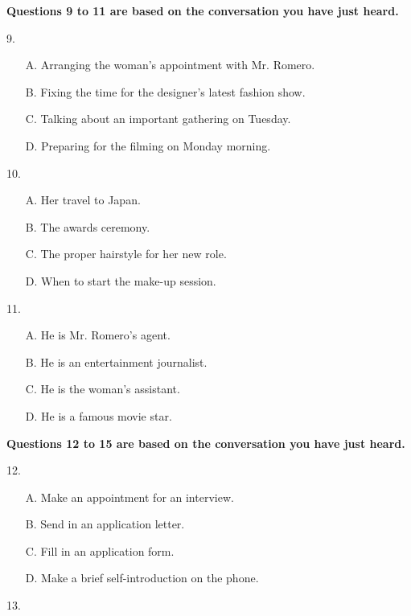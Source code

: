 \documentclass[UTF8,11pt]{ctexart}
\begin{document}
\textbf{Questions 9 to 11 are based on the conversation you have just heard.}


9.


\begin{itemize}[leftmargin=2em,itemsep=.2em,topsep=.4em]\item[A.] Arranging the woman's appointment with Mr. Romero.
\item[B.] Fixing the time for the designer's latest fashion show.
\item[C.] Talking about an important gathering on Tuesday.
\item[D.] Preparing for the filming on Monday morning.
\end{itemize}

10.


\begin{itemize}[leftmargin=2em,itemsep=.2em,topsep=.4em]\item[A.] Her travel to Japan.
\item[B.] The awards ceremony.
\item[C.] The proper hairstyle for her new role.
\item[D.] When to start the make-up session.
\end{itemize}

11.


\begin{itemize}[leftmargin=2em,itemsep=.2em,topsep=.4em]\item[A.] He is Mr. Romero's agent.
\item[B.] He is an entertainment journalist.
\item[C.] He is the woman's assistant.
\item[D.] He is a famous movie star.
\end{itemize}

\textbf{Questions 12 to 15 are based on the conversation you have just heard.}


12.


\begin{itemize}[leftmargin=2em,itemsep=.2em,topsep=.4em]\item[A.] Make an appointment for an interview.
\item[B.] Send in an application letter.
\item[C.] Fill in an application form.
\item[D.] Make a brief self-introduction on the phone.
\end{itemize}

13.
\end{document}
